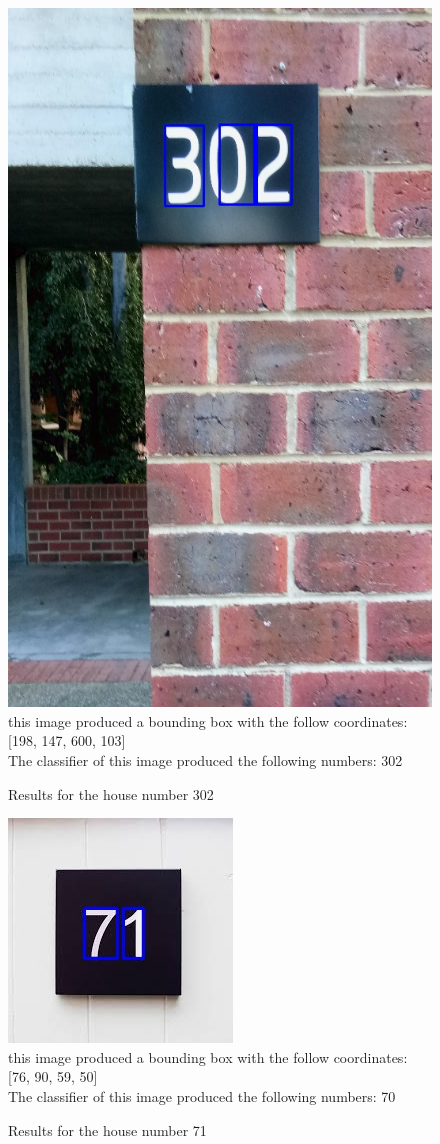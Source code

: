\documentclass[
	12pt, %
]{fphw}
\begin{document}
\begin{figure}[htp]
	\begin{problem}
	\begin{center}
	\includegraphics[width=0.30\linewidth]{"output/DetectedArea1"}
	\\this image produced a bounding box with the follow coordinates: [198, 147, 600, 103]\\
	The classifier of this image produced the following numbers: 302

	\end{center}
	\end{problem}
	\caption{Results for the house number 302}
	\label{Results for the house number 302}
\end{figure}

\begin{figure}[htp]
	\begin{problem}
	\begin{center}
	\includegraphics[width=0.25\linewidth]{"output/DetectedArea2"}
	\\this image produced a bounding box with the follow coordinates: [76, 90, 59, 50]\\
	The classifier of this image produced the following numbers: 70

	\end{center}
	\end{problem}
	\caption{Results for the house number 71}
	\label{Results for the house number 71}
\end{figure}
\end{document}
